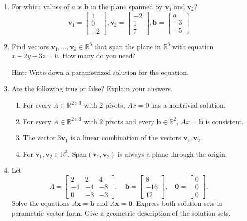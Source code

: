 \documentclass[12pt,a4paper]{amsart}
\newcommand{\bb}{\mathbf{b}}
\newcommand{\bv}{\mathbf{v}}
\newcommand{\bx}{\mathbf{x}}
\newcommand{\R}{\mathbb{R}}
\begin{document}
\begin{enumerate}
\item
 For which values of $a$ is $\bb$ in the plane spanned by $\bv_1$ and $\bv_2$?
 \[ \bv_1 = \left[ \begin{array}{c} 1 \\ 0 \\ -2 
\end{array} \right],
\bv_2 = \left[ \begin{array}{c} -2 \\ 1 \\ 7 
\end{array} \right],
\bb = \left[ \begin{array}{c} a \\ -3 \\ -5 
\end{array} \right] \]



\item
 Find vectors $\bv_1,\dots,\bv_k\in\R^3$ that span the plane in $\R^3$ with equation $x-2y+3z = 0$.
 How many do you need?

 Hint: Write down a parametrized solution for the equation. 


\item
 Are the following true or false? Explain your answers.
\begin{enumerate}
\item
 For every $A\in\R^{2\times 3}$ with $2$ pivots, $Ax=0$ has a nontrivial solution.
  
\item
 For every $A\in\R^{2\times 3}$ with $2$ pivots and every $\bb\in\R^2$, $Ax=\bb$ is consistent.

\item
 The vector $3\bv_1$ is a linear combination of the vectors $\bv_1,\bv_2$.

\item
 For $\bv_1,\bv_2\in\mathbb{R}^3$, Span$(\bv_1,\bv_2)$ is always a plane 
 through the origin.
\end{enumerate}



\item \cite[cf. Section 1.5, Ex 17]{La-LA}
Let 
\[ 
A=\left[\begin{matrix} 2 & 2 & 4 \\ -4 & -4 & -8 \\ 0 & -3 & -3 
\end{matrix}\right], \quad 
\bb=\left[\begin{matrix} 8 \\ -16 \\ 12 \end{matrix}\right], \quad
\mathbf{0}=\left[\begin{matrix} 0 \\ 0 \\ 0 \end{matrix}\right]. 
\]
Solve the equations $A\bx=\bb$ and  $A\bx=\mathbf{0}$. Express both solution sets in parametric vector form.
Give a geometric description of the solution sets.


\end{enumerate}
\end{document}
